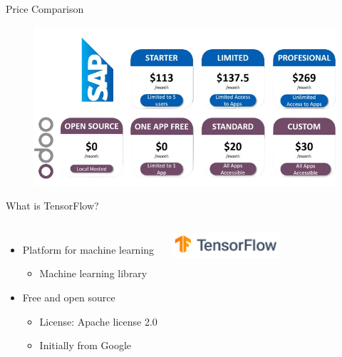 \begin{frame}{Price Comparison}
    
\begin{figure}
    \centering
    \includegraphics[width=0.70\linewidth]{assets/OdooPrices-removebg-preview.png}
\end{figure}
\end{frame}

\begin{frame}{What is TensorFlow?}
    \begin{columns}[T]
            \vspace{1cm}
            \begin{itemize}
                \item Platform for machine learning
                \begin{itemize}
                    \item Machine learning library
                \end{itemize}
                \item Free and open source
                \begin{itemize}
                    \item License: Apache license 2.0
                    \item Initially from Google
                \end{itemize}
            \end{itemize}
        
             \vspace{-1cm}
             \hspace*{-4cm}
             \includegraphics[width=4cm]{assets/TensorFlow_logo_tp.png}
    \end{columns}
\end{frame}

